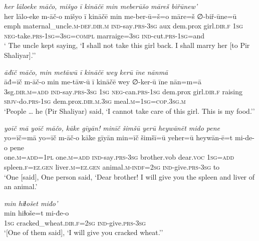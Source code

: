 \ea \label{ŽP.225}
\textit{her lāloeke māčo, mišyo ī kināčē min meberūšo māreš biřūnew’} \\ 
\gll her lālo-eke m-āč-o mišyo ī kināčē min me-ber-ū=š=o māre=š ∅-biř-ūne=ū \\ 
 emph maternal\_uncle\textsc{.m}\textsc{-def}\textsc{.dir}\textsc{.m} \textsc{ind-}say\textsc{.prs}\textsc{-3sg} aux dem.prox girl\textsc{.dir}\textsc{.f} \textsc{1sg} \textsc{neg-}take\textsc{.prs}\textsc{-\textsc{1sg}}\textsc{=3sg}\textsc{=compl} marraige\textsc{=3sg} \textsc{ind-}cut\textsc{.prs}\textsc{-\textsc{1sg}}=and \\ 
\glt ` The uncle kept saying, ‘I shall not take this girl back. I shall marry her [to Pir Shaliyar].’'
\z 
 
\ea \label{ŽP.226}
\textit{āđīč māčo, min metāwū ī kināčē wey kerū īne nānmā} \\ 
\gll āđ=īč m-āč-o min me-tāw-ū ī kināčē wey ∅-ker-ū īne nān=m=ā \\ 
 3sg\textsc{.dir}\textsc{.m}\textsc{=add} \textsc{ind-}say\textsc{.prs}\textsc{-3sg} \textsc{1sg} \textsc{neg-}can\textsc{.prs}\textsc{-\textsc{1sg}} dem.prox girl\textsc{.dir}\textsc{.f} raising \textsc{sbjv-}do\textsc{.prs}\textsc{-\textsc{1sg}} dem.prox\textsc{.dir}\textsc{.m}\textsc{.3sg} meal\textsc{.m}\textsc{=\textsc{1sg}}\textsc{=cop}\textsc{.3sg}\textsc{.m} \\ 
\glt `People … he (Pir Shaliyar) said, ‘I cannot take care of this girl. This is my food.’'
\z 
 
\ea \label{ŽP.230}
\textit{yoīč mā yoīč māčo, kāke gīyān! minīč šimšū yerū heywānēt mido pene} \\ 
\gll yo=īč=mā yo=īč m-āč-o kāke gīyān min=īč šimšī=ū yeher=ū heywān-ē=t mi-de-o pene \\ 
 one\textsc{.m}\textsc{=add}\textsc{=1pl} one\textsc{.m}\textsc{=add} \textsc{ind-}say\textsc{.prs}\textsc{-3sg} brother.vob dear.\textsc{voc} \textsc{1sg}\textsc{=add} spleen\textsc{.f}\textsc{\textsc{=ez.gen}} liver\textsc{.m}\textsc{\textsc{=ez.gen}} animal\textsc{.m}\textsc{-indf}\textsc{=\textsc{2sg}} \textsc{ind-}give\textsc{.prs}\textsc{-3sg} to \\ 
\glt `One [said], One person said, ‘Dear brother! I will give you the spleen and liver of an animal.'
\z 
 
\ea \label{ŽP.236}
\textit{min hiɫošet miđo’} \\ 
\gll min hiɫoše=t mi-đe-o \\ 
 \textsc{1sg} cracked\_wheat\textsc{.dir}\textsc{.f}\textsc{=\textsc{2sg}} \textsc{ind-}give\textsc{.prs}\textsc{-3sg} \\ 
\glt `[One of them said], ‘I will give you cracked wheat.’'
\z 
 
